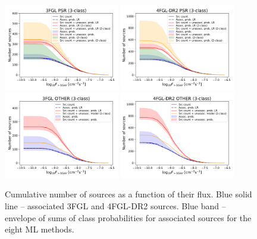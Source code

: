 \begin{figure}[h]
\center
\includegraphics[width=0.45\textwidth]{plots/N_logS_3FGL_PSR_3classes.pdf}
\includegraphics[width=0.45\textwidth]{plots/N_logS_4FGL-DR2_PSR_3classes.pdf} \\
\includegraphics[width=0.45\textwidth]{plots/N_logS_3FGL_OTHER_3classes.pdf}
\includegraphics[width=0.45\textwidth]{plots/N_logS_4FGL-DR2_OTHER_3classes.pdf}
\caption{Cumulative number of sources as a function of their flux. 
Blue solid line -- associated 3FGL and 4FGL-DR2  sources. 
Blue band -- envelope of sums of class probabilities for associated sources for the eight ML methods. 
}
\end{figure}
